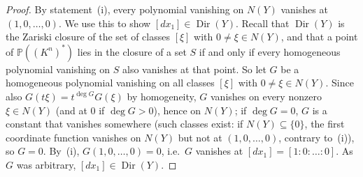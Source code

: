 \documentclass[pdflatex,sn-mathphys-num]{sn-jnl}
\numberwithin{equation}{section}
\theoremstyle{thmstyleone}
\theoremstyle{thmstyletwo}
\begin{document}
\begin{proof}
By statement~(i), every polynomial vanishing on $N(Y)$ vanishes at $(1,0,\dots,0)$. We
use this to show $[dx_1]\in\operatorname{Dir}(Y)$. Recall that $\operatorname{Dir}(Y)$ is the Zariski closure of the set of classes $[\xi]$ with $0\ne\xi\in N(Y)$, and that a point of $\mathbb P((K^n)^*)$ lies in the closure of a set $S$ if and only if every homogeneous polynomial vanishing on $S$ also vanishes at that point. So let $G$ be a homogeneous polynomial vanishing on all classes $[\xi]$ with $0\ne\xi\in N(Y)$. Since also $G(t\xi)=t^{\deg G}G(\xi)$ by homogeneity, $G$ vanishes on every nonzero $\xi\in N(Y)$ (and at $0$ if $\deg G>0$), hence on $N(Y)$; if $\deg G=0$, $G$ is a constant that vanishes somewhere (such classes exist: if $N(Y)\subseteq\{0\}$, the first coordinate function vanishes on $N(Y)$ but not at $(1,0,\dots,0)$, contrary to~(i)), so $G=0$. By~(i), $G(1,0,\dots,0)=0$,
i.e.\ $G$ vanishes at $[dx_1]=[1:0:\dots:0]$. As $G$ was arbitrary,
$[dx_1]\in\operatorname{Dir}(Y)$.
\end{proof}

\end{document}
